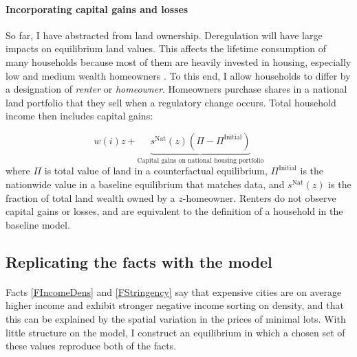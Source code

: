 \documentclass[12pt]{article}
\begin{document}
	\paragraph*{Incorporating capital gains and losses} So far, I have abstracted from land ownership. Deregulation will have large impacts on equilibrium land values. This affects the lifetime consumption of many households because most of them are heavily invested in housing, especially low and medium wealth homeowners \citep{Greaney}. To this end, I allow households to differ by a designation of \textit{renter} or \textit{homeowner}. Homeowners purchase shares in a national land portfolio that they sell when a regulatory change occurs. Total household income then includes capital gains:
	
	\begin{equation}\label{CapGainsandLosses}
		w(i)z + \underbrace{s^{\text{Nat}}(z)(\Pi -\Pi^{\text{Initial}} )}_{\text{Capital gains on national housing portfolio}}
	\end{equation}
	where $\Pi$ is total value of land in a counterfactual equilibrium, $\Pi^{\text{Initial}}$ is the nationwide value in a baseline equilibrium that matches data, and $s^{\text{Nat}}(z)$ is the fraction of total land wealth owned by a $z$-homeowner. Renters do not observe capital gains or losses, and are equivalent to the definition of a household in the baseline model.  
	
	\subsection{Replicating the facts with the model}\label{SubSection:ReplicatingFacts}
		
	\paragraph*{}
	Facts \ref{FIncomeDens} and \ref{FStringency} say that expensive cities are on average higher income and exhibit stronger negative income sorting on density, and that this can be explained by the spatial variation in the prices of minimal lots. With little structure on the model, I construct an equilibrium in which a chosen set of these values reproduce both of the facts. 
\end{document}
